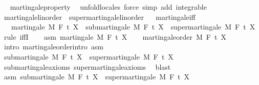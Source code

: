 \begin{isabellebody}
\isadelimproof
\ %
\endisadelimproof
%
\isatagproof
{}\isamarkupfalse%
\ martingale{\isacharunderscore}{\kern0pt}property\ \isamarkupfalse%
\ {\isacharparenleft}{\kern0pt}unfold{\isacharunderscore}{\kern0pt}locales{\isacharparenright}{\kern0pt}\ {\isacharparenleft}{\kern0pt}force\ simp\ add{\isacharcolon}{\kern0pt}\ integrable{\isacharparenright}{\kern0pt}{\isacharplus}{\kern0pt}%
\endisatagproof
{\isafoldproof}%
%
\isadelimproof
%
\endisadelimproof
\isanewline
{}\isamarkupfalse%
\ martingale{\isacharunderscore}{\kern0pt}linorder\ {\isasymsubseteq}\ supermartingale{\isacharunderscore}{\kern0pt}linorder%
\isadelimproof
\ %
\endisadelimproof
%
\isatagproof
\isacommand{{\isachardot}{\kern0pt}{\isachardot}{\kern0pt}}\isamarkupfalse%
%
\endisatagproof
{\isafoldproof}%
%
\isadelimproof
%
\endisadelimproof
\isanewline
\isanewline
{}\isamarkupfalse%
\ martingale{\isacharunderscore}{\kern0pt}iff{\isacharcolon}{\kern0pt}\ \isanewline
\ \ \ {\isachardoublequoteopen}martingale\ M\ F\ t\ X\ {\isasymlongleftrightarrow}\ submartingale\ M\ F\ t\ X\ {\isasymand}\ supermartingale\ M\ F\ t\ X{\isachardoublequoteclose}\isanewline
%
\isadelimproof
%
\endisadelimproof
%
\isatagproof
{}\isamarkupfalse%
\ {\isacharparenleft}{\kern0pt}rule\ iffI{\isacharparenright}{\kern0pt}\isanewline
\ \ \isamarkupfalse%
\ asm{\isacharcolon}{\kern0pt}\ {\isachardoublequoteopen}martingale\ M\ F\ t\ X{\isachardoublequoteclose}\isanewline
\ \ \isamarkupfalse%
\ martingale{\isacharunderscore}{\kern0pt}order\ M\ F\ t\ X\ \isamarkupfalse%
\ {\isacharparenleft}{\kern0pt}intro\ martingale{\isacharunderscore}{\kern0pt}order{\isachardot}{\kern0pt}intro\ asm{\isacharparenright}{\kern0pt}\isanewline
\ \ \isamarkupfalse%
\ {\isachardoublequoteopen}submartingale\ M\ F\ t\ X\ {\isasymand}\ supermartingale\ M\ F\ t\ X{\isachardoublequoteclose}\ \isamarkupfalse%
\ submartingale{\isacharunderscore}{\kern0pt}axioms\ supermartingale{\isacharunderscore}{\kern0pt}axioms\ \isamarkupfalse%
\ blast\isanewline
{}\isamarkupfalse%
\isanewline
\ \ \isamarkupfalse%
\ asm{\isacharcolon}{\kern0pt}\ {\isachardoublequoteopen}submartingale\ M\ F\ t\ X\ {\isasymand}\ supermartingale\ M\ F\ t\ X{\isachardoublequoteclose}\isanewline

\end{isabellebody}
